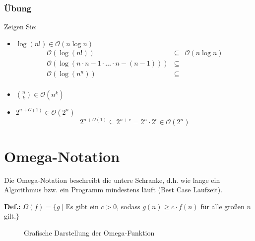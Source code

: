 \subsubsection{Übung}
Zeigen Sie:
\begin{itemize}
	\item \(\log(n!) \in \mathcal{O}(n \log n)\)
		\begin{eqnarray*}
			\mathcal{O}(\log(n!)) &\subseteq& \mathcal{O}(n \log n) \\
			\mathcal{O}(\log(n \cdot n-1 \cdot \ldots \cdot n-(n-1))) &\subseteq&	\\
			\mathcal{O}(\log(n^n)) &\subseteq&	\\
		\end{eqnarray*}
	\item \(\binom{n}{k} \in \mathcal{O}(n^k)\)
	\item \(2^{n+\mathcal{O}(1)} \in \mathcal{O}(2^n)\)
		\[2^{n+\mathcal{O}(1)} \subseteq 2^{n+c} = 2^n \cdot 2^c \in \mathcal{O}(2^n)\]
\end{itemize}



\section{Omega-Notation}
\label{sec:OmegaNotation}
Die Omega-Notation beschreibt die untere Schranke, d.h. wie lange ein Algorithmus bzw. ein Programm mindestens läuft (Best Case Laufzeit).
\begin{shaded}
	\noindent
	\textbf{Def.:} \(\Omega(f) = \{ g \:|\) Es gibt ein \(c > 0\), sodass \(g(n) \geq c \cdot f(n)\) für alle großen \(n\) gilt.\(\}\)
\end{shaded}

\begin{figure}[htbp]
	\begin{center}
	\end{center}
	\label{img:OmegaNotation}
	\caption{Grafische Darstellung der Omega-Funktion}
\end{figure}

